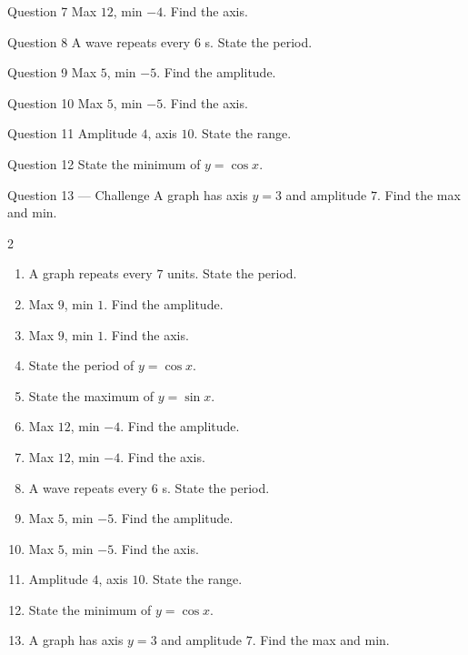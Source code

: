 \documentclass[11pt]{article}
\begin{document}
\begin{qbox}{Question 7}
Max $12$, min $-4$. Find the axis.\workspace{2.4cm}
\end{qbox}

\begin{qbox}{Question 8}
A wave repeats every $6$ s. State the period.\workspace{2.4cm}
\end{qbox}

\begin{qbox}{Question 9}
Max $5$, min $-5$. Find the amplitude.\workspace{2.4cm}
\end{qbox}

\begin{qbox}{Question 10}
Max $5$, min $-5$. Find the axis.\workspace{2.4cm}
\end{qbox}

\begin{qbox}{Question 11}
Amplitude $4$, axis $10$. State the range.\workspace{2.4cm}
\end{qbox}

\begin{qbox}{Question 12}
State the minimum of $y=\cos x$.\workspace{2.4cm}
\end{qbox}

\begin{qbox}{Question 13 --- Challenge}
A graph has axis $y=3$ and amplitude $7$. Find the max and min.\workspace{3cm}
\end{qbox}

\clearpage
{}

\begin{recapbox}
\begin{multicols}{2}
\small
\begin{enumerate}[leftmargin=*,itemsep=3pt]
  \item A graph repeats every $7$ units. State the period.
  \item Max $9$, min $1$. Find the amplitude.
  \item Max $9$, min $1$. Find the axis.
  \item State the period of $y=\cos x$.
  \item State the maximum of $y=\sin x$.
  \item Max $12$, min $-4$. Find the amplitude.
  \item Max $12$, min $-4$. Find the axis.
  \item A wave repeats every $6$ s. State the period.
  \item Max $5$, min $-5$. Find the amplitude.
  \item Max $5$, min $-5$. Find the axis.
  \item Amplitude $4$, axis $10$. State the range.
  \item State the minimum of $y=\cos x$.
  \item A graph has axis $y=3$ and amplitude $7$. Find the max and min.
\end{enumerate}
\end{multicols}
\end{recapbox}
\end{document}
